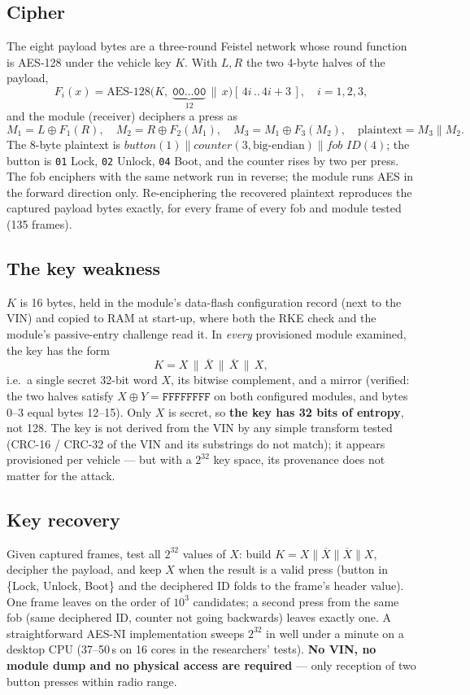 \documentclass[11pt,a4paper]{article}
\newcommand{\hex}[1]{\texttt{#1}}
\begin{document}
\subsection{Cipher}
The eight payload bytes are a three-round Feistel network whose round function is AES-128 under the vehicle key $K$. With $L,R$ the two 4-byte halves of the payload,
\[
F_i(x) = \mathrm{AES\text{-}128}\big(K,\; \underbrace{\hex{00}\dots\hex{00}}_{12}\,\|\,x\big)[\,4i\,..\,4i{+}3\,], \quad i=1,2,3,
\]
and the module (receiver) deciphers a press as
\[
M_1 = L \oplus F_1(R),\quad M_2 = R \oplus F_2(M_1),\quad M_3 = M_1 \oplus F_3(M_2),\quad \text{plaintext} = M_3 \parallel M_2 .
\]
The 8-byte plaintext is $\textit{button}(1)\parallel\textit{counter}(3,\text{big-endian})\parallel\textit{fob ID}(4)$; the button is \hex{01} Lock, \hex{02} Unlock, \hex{04} Boot, and the counter rises by two per press. The fob enciphers with the same network run in reverse; the module runs AES in the forward direction only. Re-enciphering the recovered plaintext reproduces the captured payload bytes exactly, for every frame of every fob and module tested (135 frames).

\subsection{The key weakness}
$K$ is 16 bytes, held in the module's data-flash configuration record (next to the VIN) and copied to RAM at start-up, where both the RKE check and the module's passive-entry challenge read it. In \emph{every} provisioned module examined, the key has the form
\[
K = X \,\|\, \overline{X} \,\|\, \overline{X} \,\|\, X ,
\]
i.e.\ a single secret 32-bit word $X$, its bitwise complement, and a mirror (verified: the two halves satisfy $X \oplus Y = \hex{FFFFFFFF}$ on both configured modules, and bytes 0--3 equal bytes 12--15). Only $X$ is secret, so \textbf{the key has 32 bits of entropy}, not 128. The key is not derived from the VIN by any simple transform tested (CRC-16 / CRC-32 of the VIN and its substrings do not match); it appears provisioned per vehicle --- but with a $2^{32}$ key space, its provenance does not matter for the attack.

\subsection{Key recovery}
Given captured frames, test all $2^{32}$ values of $X$: build $K = X\|\overline{X}\|\overline{X}\|X$, decipher the payload, and keep $X$ when the result is a valid press (button in \{Lock, Unlock, Boot\} and the deciphered ID folds to the frame's header value). One frame leaves on the order of $10^3$ candidates; a second press from the same fob (same deciphered ID, counter not going backwards) leaves exactly one. A straightforward AES-NI implementation sweeps $2^{32}$ in well under a minute on a desktop CPU (37--50\,s on 16 cores in the researchers' tests). \textbf{No VIN, no module dump and no physical access are required} --- only reception of two button presses within radio range.
\end{document}
